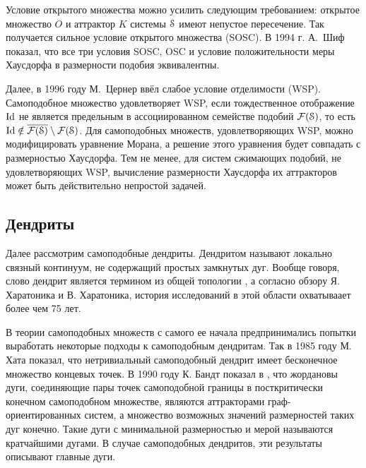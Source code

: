 Условие открытого множества можно усилить следующим требованием: открытое множество $O$ и аттрактор $K$ системы ${\EuScript S}$ имеют непустое пересечение. 
Так получается сильное условие открытого множества (SOSC).
В 1994 г. А.~Шиф \cite{Schief1994} показал, что все три условия SOSC, OSC и условие положительности меры Хаусдорфа в размерности подобия эквивалентны.

Далее, в 1996 году М.~Цернер \cite{Zerner1996} ввёл слабое условие отделимости (WSP).
Самоподобное множество удовлетворяет WSP, если тождественное отображение $\mathop{\rm Id} \nolimits$ не является предельным в ассоциированном семействе подобий $\mathcal{F}({\EuScript S})$, то есть $\mathop{\rm Id} \nolimits\notin\overline{\mathcal{F}({\EuScript S})}\setminus\mathcal{F}({\EuScript S})$.
Для самоподобных множеств, удовлетворяющих WSP, можно модифицировать уравнение Морана, а решение этого уравнения будет совпадать с размерностью Хаусдорфа.
Тем не менее, для систем сжимающих подобий, не удовлетворяющих WSP, вычисление размерности Хаусдорфа их аттракторов может быть действительно непростой задачей.


\subsection{Дендриты}

Далее рассмотрим самоподобные дендриты.
Дендритом называют локально связный континуум, не содержащий простых замкнутых дуг.
Вообще говоря, слово дендрит является термином из общей топологии \cite{Kur1, Kur2}, а согласно обзору \cite{Char1998} Я. Харатоника и В. Харатоника, история исследований в этой области охватываает более чем 75 лет.

В теории самоподобных множеств с самого ее начала предпринимались попытки выработать некоторые подходы к самоподобным дендритам.
Так в 1985 году М. Хата \cite{Hata1985} показал, что нетривиальный самоподобный дендрит имеет бесконечное множество концевых точек.
В 1990 году К. Бандт показал в \cite{SSS6}, что жордановы дуги, соединяющие пары точек самоподобной границы в посткритически конечном самоподобном множестве, являются аттракторами граф-ориентированных систем, а множество возможных значений размерностей таких дуг конечно.
Такие дуги с минимальной размерностью и мерой называются кратчайшими дугами.
В случае самоподобных дендритов, эти результаты описывают главные дуги.

